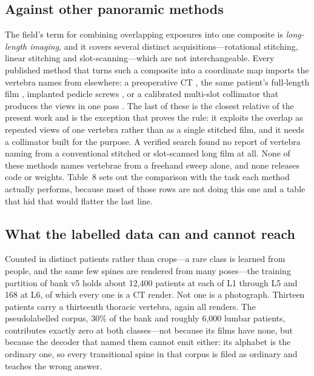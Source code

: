 \documentclass[11pt,letterpaper]{article}
\begin{document}
\subsection*{Against other panoramic methods}
The field's term for combining overlapping exposures into one composite is \emph{long-length imaging}, and it covers several distinct acquisitions---rotational stitching, linear stitching and slot-scanning---which are not interchangeable. Every published method that turns such a composite into a coordinate map imports the vertebra names from elsewhere: a preoperative CT \citep{levelcheck2012,otake2015}, the same patient's full-length film \citep{vdvm2023}, implanted pedicle screws \citep{sxstitch2024}, or a calibrated multi-slot collimator that produces the views in one pass \citep{huang2022}. The last of these is the closest relative of the present work and is the exception that proves the rule: it exploits the overlap as repeated views of one vertebra rather than as a single stitched film, and it needs a collimator built for the purpose. A verified search found no report of vertebra naming from a conventional stitched or slot-scanned long film at all. None of these methods names vertebrae from a freehand sweep alone, and none releases code or weights. Table~8 sets out the comparison with the task each method actually performs, because most of those rows are not doing this one and a table that hid that would flatter the last line.

\subsection*{What the labelled data can and cannot reach}
Counted in distinct patients rather than crops---a rare class is learned from people, and the same few spines are rendered from many poses---the training partition of bank v5 holds about 12,400 patients at each of L1 through L5 and 168 at L6, of which every one is a CT render. Not one is a photograph. Thirteen patients carry a thirteenth thoracic vertebra, again all renders. The pseudolabelled corpus, 30\% of the bank and roughly 6,000 lumbar patients, contributes exactly zero at both classes---not because its films have none, but because the decoder that named them cannot emit either: its alphabet is the ordinary one, so every transitional spine in that corpus is filed as ordinary and teaches the wrong answer.
\end{document}
